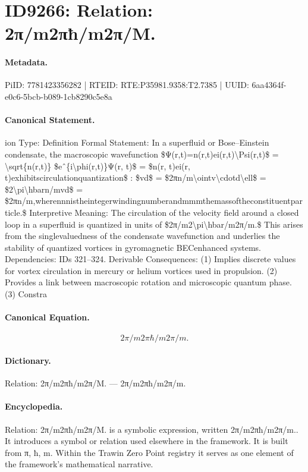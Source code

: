 \section*{ID9266: Relation: 2π/m2πħ/m2π/M.}
\paragraph{Metadata.}
PiID: 7781423356282 | RTEID: RTE:P35981.9358:T2.7385 | UUID: 6aa4364f-e0c6-5bcb-b089-1cb8290c5e8a

\paragraph{Canonical Statement.}
ion Type: Definition Formal Statement: In a superfluid or Bose–Einstein condensate, the macroscopic wavefunction \$Ψ(r,t)=n(r,t)ei(r,t)\textbackslash{}Psi(r,t)\$ = \textbackslash{}sqrt\{n(r,t)\} \$eˆ\{i\textbackslash{}phi(r,t)\}Ψ(r, t)\$ = \$n(r, t)ei(r, t)exhibitscirculationquantization\$ : \$vd\$ = \$2πn/m\textbackslash{}ointv\textbackslash{}cdotd\textbackslash{}ell\$ = \$2\textbackslash{}pi\textbackslash{}hbarn/mvd\$ = \$2πn/m,wherennnistheintegerwindingnumberandmmmthemassoftheconstituentparticle.\$ Interpretive Meaning: The circulation of the velocity field around a closed loop in a superfluid is quantized in units of \$2π/m2\textbackslash{}pi\textbackslash{}hbar/m2π/m.\$ This arises from the singlevaluedness of the condensate wavefunction and underlies the stability of quantized vortices in gyromagnetic BECenhanced systems. Dependencies: IDs 321–324. Derivable Consequences: (1) Implies discrete values for vortex circulation in mercury or helium vortices used in propulsion. (2) Provides a link between macroscopic rotation and microscopic quantum phase. (3) Constra

\paragraph{Canonical Equation.}
\[
2π/m2\pi\hbar/m2π/m.
\]

\paragraph{Dictionary.}
Relation: 2π/m2πħ/m2π/M. — 2π/m2πħ/m2π/m.

\paragraph{Encyclopedia.}
Relation: 2π/m2πħ/m2π/M. is a symbolic expression, written 2π/m2πħ/m2π/m.. It introduces a symbol or relation used elsewhere in the framework. It is built from π, ħ, m. Within the Trawin Zero Point registry it serves as one element of the framework's mathematical narrative.
